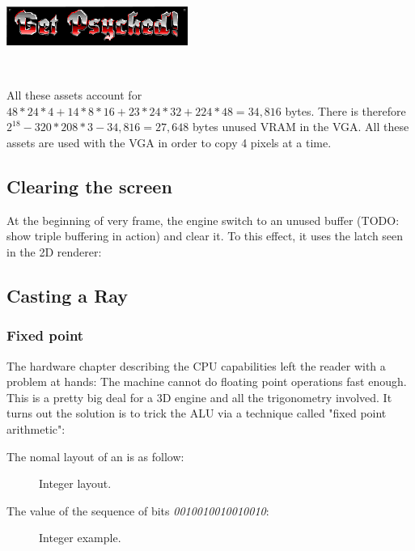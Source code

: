 \begin{minipage}{.3\textwidth}
     \includegraphics[width=\textwidth]{imgs/latched/134.png}
  \end{minipage}\


All these assets account for $48*24*4+14*8*16+23*24*32+224*48=34,816$ bytes. There is therefore $2^18-320*208*3 - 34,816=27,648$ bytes unused VRAM in the VGA.
All these assets are used with the VGA in order to copy 4 pixels at a time.


\subsection{Clearing the screen}
At the beginning of very frame, the engine switch to an unused buffer (TODO: show triple buffering in action) and clear it. To this effect, it uses the latch seen in the 2D renderer: 





\subsection{Casting a Ray}








\subsubsection{Fixed point}
The hardware chapter describing the CPU capabilities left the reader with a problem at hands: The machine cannot do floating point operations fast enough. This is a pretty big deal for a 3D engine and all the trigonometry involved. It turns out the solution is to trick the ALU via a technique called "fixed point arithmetic":\\
\par
The nomal layout of an  is as follow:
\begin{figure}[H]
\centering
 
 \caption{Integer layout.} \label{fig:int_layout}
 \end{figure}
The value of the sequence of bits \emph{0010010010010010}:
\begin{figure}[H]
\centering

 \caption{Integer example.} \label{fig:mips}
 \end{figure}

